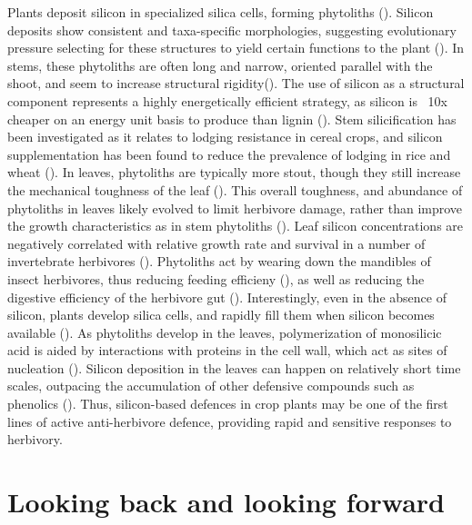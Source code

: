 \documentclass[12pt, letterpaper, ]{report}
\begin{document}
Plants deposit silicon in specialized silica cells, forming phytoliths (\cite{waterman_short-term_2021}). Silicon deposits show consistent and taxa-specific morphologies, suggesting evolutionary pressure selecting for these structures to yield certain functions to the plant (\cite{piperno_phytoliths_2006}). In stems, these phytoliths are often long and narrow, oriented parallel with the shoot, and seem to increase structural rigidity(\cite{stromberg_functions_2016}). The use of silicon as a structural component represents a highly energetically efficient strategy, as silicon is ~10x cheaper on an energy unit basis to produce than lignin (\cite{stromberg_functions_2016}). Stem silicification has been investigated as it relates to lodging resistance in cereal crops, and silicon supplementation has been found to reduce the prevalence of lodging in rice and wheat (\cite{dorairaj_influence_2017,muszynska_mechanistic_2021}). In leaves, phytoliths are typically more stout, though they still increase the mechanical toughness of the leaf (\cite{simpson_still_2017}). This overall toughness, and abundance of phytoliths in leaves likely evolved to limit herbivore damage, rather than improve the growth characteristics as in stem phytoliths (\cite{stromberg_functions_2016}). Leaf silicon concentrations are negatively correlated with relative growth rate and survival in a number of invertebrate herbivores (\cite{juma_influence_2015,massey_silica_2006,mir_silicon_2019}). Phytoliths act by wearing down the mandibles of insect herbivores, thus reducing feeding efficieny (\cite{waterman_short-term_2021-1,mir_silicon_2019}), as well as reducing the digestive efficiency of the herbivore gut (\cite{hunt_novel_2008}). Interestingly, even in the absence of silicon, plants develop silica cells, and rapidly fill them when silicon becomes available (\cite{waterman_short-term_2021-1}). As phytoliths develop in the leaves, polymerization of monosilicic acid is aided by interactions with proteins in the cell wall, which act as sites of nucleation (\cite{nawaz_phytolith_2019}). Silicon deposition in the leaves can happen on relatively short time scales, outpacing the accumulation of other defensive compounds such as phenolics (\cite{waterman_short-term_2021}). Thus, silicon-based defences in crop plants may be one of the first lines of active anti-herbivore defence, providing rapid and sensitive responses to herbivory. 

\section{Looking back and looking forward}
\end{document}
